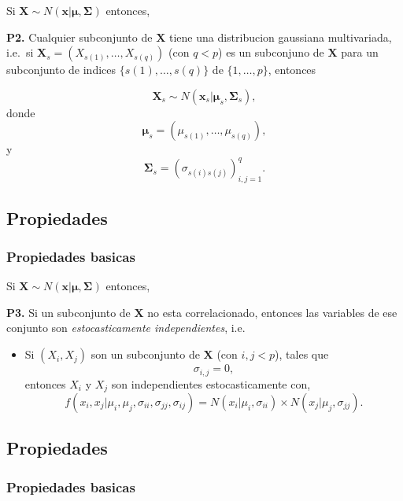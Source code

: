 \documentclass[11pt,]{article}
\providecommand{\tightlist}{%
\setlength{\itemsep}{0pt}\setlength{\parskip}{0pt}}
\begin{document}
Si
\(\boldsymbol{X} \sim N(\boldsymbol{x}|\boldsymbol{\mu},\boldsymbol{\Sigma})\)
entonces,

\textbf{P2.} Cualquier subconjunto de \(\boldsymbol{X}\) tiene una
distribucion gaussiana multivariada, i.e.~si
\(\boldsymbol{X}_{s}=(X_{s(1)},\ldots,X_{s(q)})\) (con \(q<p\)) es un
subconjuno de \(\boldsymbol{X}\) para un subconjunto de indices
\(\{s(1),\ldots,s(q)\}\) de \(\{1,\ldots,p\}\), entonces

\[
\boldsymbol{X}_{s} 
\sim
N(\boldsymbol{x}_{s}|\boldsymbol{\mu}_{s} ,\boldsymbol{\Sigma}_{s}),
\] donde \[
\boldsymbol{\mu}_s=(\mu_{s(1)},\ldots,\mu_{s(q)}),
\] y \[
\boldsymbol{\Sigma}_s=\left(\sigma_{s(i)s(j)}\right)_{i,j=1}^{q}.
\]

\subsection{Propiedades}\label{propiedades-2}

\subsubsection{Propiedades basicas}\label{propiedades-basicas-2}

Si
\(\boldsymbol{X} \sim N(\boldsymbol{x}|\boldsymbol{\mu},\boldsymbol{\Sigma})\)
entonces,

\textbf{P3.} Si un subconjunto de \(\boldsymbol{X}\) no esta
correlacionado, entonces las variables de ese conjunto son
\emph{estocasticamente independientes}, i.e.

\begin{itemize}
\tightlist
\item
  Si \((X_i,X_j)\) son un subconjunto de \(\boldsymbol{X}\) (con
  \(i,j<p\)), tales que \[\sigma_{i,j}=0,\] entonces \(X_i\) y \(X_j\)
  son independientes estocasticamente con, \[
  f(x_i,x_j|\mu_i,\mu_j,\sigma_{ii},\sigma_{jj},\sigma_{ij}) = N(x_i|\mu_i,\sigma_{ii})\times N(x_j|\mu_j,\sigma_{jj}).
  \]
\end{itemize}

\subsection{Propiedades}\label{propiedades-3}

\subsubsection{Propiedades basicas}\label{propiedades-basicas-3}
\end{document}
